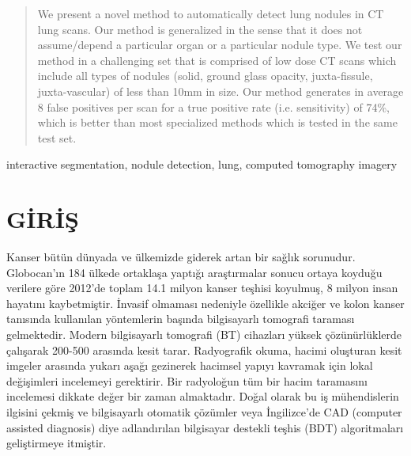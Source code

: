 \documentclass[conference]{IEEEtran}
\begin{document}
\begin{abstract}
We present a novel method to automatically detect lung nodules in CT lung scans. Our method is generalized in the sense that it does not assume/depend a particular organ or a particular nodule type. We test our method in a challenging set that is comprised of low dose CT scans which include all types of nodules (solid, ground glass opacity, juxta-fissule, juxta-vascular) of less than 10mm in size. Our method generates in average 8 false positives per scan for a true positive rate (i.e. sensitivity) of 74\%, which is better than most specialized methods which is tested in the same test set.
\end{abstract}
\begin{IEEEkeywords}
interactive segmentation, nodule detection, lung, computed tomography imagery
\end{IEEEkeywords}



%
\IEEEpeerreviewmaketitle

\IEEEpubidadjcol

\section{GİRİŞ}

Kanser bütün dünyada ve ülkemizde giderek artan bir sağlık sorunudur. Globocan’ın \cite{ferlay2012} 184 ülkede ortaklaşa yaptığı araştırmalar sonucu ortaya koyduğu verilere göre 2012’de toplam 14.1 milyon kanser teşhisi koyulmuş, 8 milyon insan hayatını kaybetmiştir. İnvasif olmaması nedeniyle özellikle akciğer ve kolon kanser tanısında kullanılan yöntemlerin başında bilgisayarlı tomografi taraması gelmektedir. Modern bilgisayarlı tomografi (BT) cihazları yüksek çözünürlüklerde çalışarak 200-500 arasında kesit tarar. Radyografik okuma, hacimi oluşturan kesit imgeler arasında yukarı aşağı gezinerek hacimsel yapıyı kavramak için lokal değişimleri incelemeyi gerektirir. Bir radyoloğun tüm bir hacim taramasını incelemesi dikkate değer bir zaman almaktadır. Doğal olarak bu iş mühendislerin ilgisini çekmiş ve bilgisayarlı otomatik çözümler veya İngilizce'de CAD (computer assisted diagnosis) diye adlandırılan bilgisayar destekli teşhis (BDT) algoritmaları geliştirmeye itmiştir.
\end{document}
